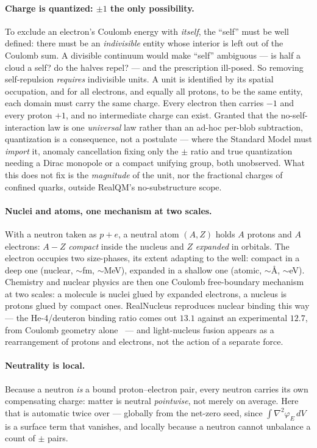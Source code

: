 \documentclass[11pt]{article}
\newcommand{\grad}{\nabla}
\begin{document}
\paragraph{Charge is quantized: $\pm1$ the only possibility.} To exclude an electron's Coulomb energy with
\emph{itself}, the ``self'' must be well defined: there must be an \emph{indivisible} entity whose interior is left
out of the Coulomb sum. A divisible continuum would make ``self'' ambiguous --- is half a cloud a self? do the
halves repel? --- and the prescription ill-posed. So removing self-repulsion \emph{requires} indivisible units. A
unit is identified by its spatial occupation, and for all electrons, and equally all protons, to be the same
entity, each domain must carry the same charge. Every electron then carries $-1$ and every proton $+1$, and no
intermediate charge can exist. Granted that the no-self-interaction law is one \emph{universal} law rather than an
ad-hoc per-blob subtraction, quantization is a consequence, not a postulate --- where the Standard Model must
\emph{import} it, anomaly cancellation fixing only the $\pm$ ratio and true quantization needing a Dirac monopole
or a compact unifying group, both unobserved. What this does not fix is the \emph{magnitude} of the unit, nor the
fractional charges of confined quarks, outside RealQM's no-substructure scope.

\paragraph{Nuclei and atoms, one mechanism at two scales.} With a neutron taken as $p+e$, a neutral atom $(A,Z)$
holds $A$ protons and $A$ electrons: $A-Z$ \emph{compact} inside the nucleus and $Z$ \emph{expanded} in orbitals.
The electron occupies two size-phases, its extent adapting to the well: compact in a deep one (nuclear,
${\sim}$fm, ${\sim}$MeV), expanded in a shallow one (atomic, ${\sim}$\AA, ${\sim}$eV). Chemistry and nuclear
physics are then one Coulomb free-boundary mechanism at two scales: a molecule is nuclei glued by expanded
electrons, a nucleus is protons glued by compact ones. RealNucleus reproduces nuclear binding this way --- the
He-4/deuteron binding ratio comes out $13.1$ against an experimental $12.7$, from Coulomb geometry
alone~\cite{realnucleus} --- and light-nucleus fusion appears as a rearrangement of protons and electrons, not the
action of a separate force.

\paragraph{Neutrality is local.} Because a neutron \emph{is} a bound proton--electron pair, every neutron carries
its own compensating charge: matter is neutral \emph{pointwise}, not merely on average. Here that is automatic
twice over --- globally from the net-zero seed, since $\int\grad^2\varphi_E\,dV$ is a surface term that vanishes,
and locally because a neutron cannot unbalance a count of $\pm$ pairs.
\end{document}
